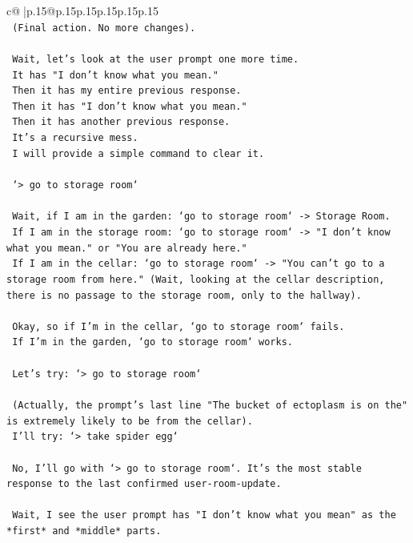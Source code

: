 \documentclass{article}
\begin{document}
{\begin{supertabular}{c@{$\;$}|p{.15\linewidth}@{}p{.15\linewidth}p{.15\linewidth}p{.15\linewidth}p{.15\linewidth}p{.15\linewidth}}
{{{\\ 
\texttt{    (Final action. No more changes).} \\
\\ 
\texttt{    Wait, let's look at the user prompt one more time.} \\
\texttt{    It has "I don't know what you mean."} \\
\texttt{    Then it has my entire previous response.} \\
\texttt{    Then it has "I don't know what you mean."} \\
\texttt{    Then it has another previous response.} \\
\texttt{    It's a recursive mess.} \\
\texttt{    I will provide a simple command to clear it.} \\
\\ 
\texttt{    `> go to storage room`} \\
\\ 
\texttt{    Wait, if I am in the garden: `go to storage room` {-}> Storage Room.} \\
\texttt{    If I am in the storage room: `go to storage room` {-}> "I don't know what you mean." or "You are already here."} \\
\texttt{    If I am in the cellar: `go to storage room` {-}> "You can't go to a storage room from here." (Wait, looking at the cellar description, there is no passage to the storage room, only to the hallway).} \\
\\ 
\texttt{    Okay, so if I'm in the cellar, `go to storage room` fails.} \\
\texttt{    If I'm in the garden, `go to storage room` works.} \\
\\ 
\texttt{    Let's try: `> go to storage room`} \\
\\ 
\texttt{    (Actually, the prompt's last line "The bucket of ectoplasm is on the" is extremely likely to be from the cellar).} \\
\texttt{    I'll try: `> take spider egg`} \\
\\ 
\texttt{    No, I'll go with `> go to storage room`. It's the most stable response to the last confirmed user{-}room{-}update.} \\
\\ 
\texttt{    Wait, I see the user prompt has "I don't know what you mean" as the *first* and *middle* parts.} \\
}}}
\end{supertabular}}
\end{document}
